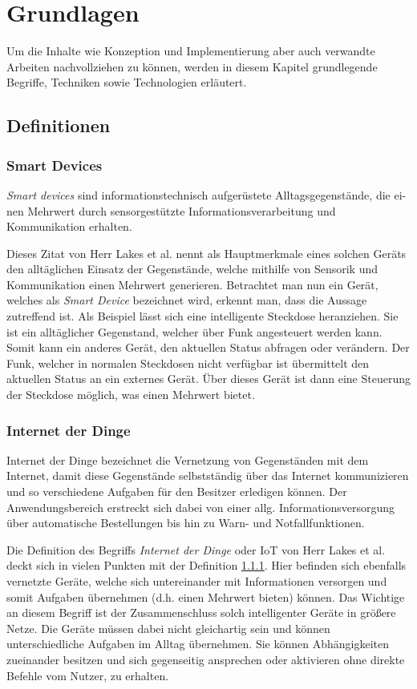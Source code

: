 \chapter{Grundlagen}
Um die Inhalte wie Konzeption und Implementierung aber auch verwandte Arbeiten nachvollziehen zu können, werden in diesem Kapitel grundlegende Begriffe, Techniken sowie Technologien erläutert.

\section{Definitionen} \label{Definitionen}
    \subsection{Smart Devices} \label{SmartDevices}
        \emph{Smart devices} sind \glqq informationstechnisch aufgerüstete Alltagsgegenstände, die ei-nen Mehrwert durch sensorgestützte Informationsverarbeitung und Kommunikation erhalten.\grqq{} \cite{lackes_siepermann_2018}
        
        Dieses Zitat von Herr Lakes et al. nennt als Hauptmerkmale eines solchen Geräts den alltäglichen Einsatz der Gegenstände, welche mithilfe von Sensorik und Kommunikation einen Mehrwert generieren.
        Betrachtet man nun ein Gerät, welches als \emph{Smart Device} bezeichnet wird, erkennt man, dass die Aussage zutreffend ist. Als Beispiel lässt sich eine intelligente Steckdose heranziehen. Sie ist ein alltäglicher Gegenstand, welcher über Funk angesteuert werden kann. Somit kann ein anderes Gerät, den aktuellen Status abfragen oder verändern.
        Der Funk, welcher in normalen Steckdosen nicht verfügbar ist übermittelt den aktuellen Status an ein externes Gerät. Über dieses Gerät ist dann eine Steuerung der Steckdose möglich, was einen Mehrwert bietet.
    
    \subsection{Internet der Dinge}
        Internet der Dinge \glqq bezeichnet die Vernetzung von Gegenständen mit dem Internet, damit diese Gegenstände selbstständig über das Internet kommunizieren und so verschiedene Aufgaben für den Besitzer erledigen können. Der Anwendungsbereich erstreckt sich dabei von einer allg. Informationsversorgung über automatische Bestellungen bis hin zu Warn- und Notfallfunktionen.\grqq{}
        \cite{lackes_siepermann_2018_iot}
    
        Die Definition des Begriffs \emph{Internet der Dinge} oder \ac{IoT} von Herr Lakes et al. deckt sich in vielen Punkten mit der Definition \ref{SmartDevices}. Hier befinden sich ebenfalls vernetzte Geräte, welche sich untereinander mit Informationen versorgen und somit Aufgaben übernehmen (d.h. einen Mehrwert bieten) können. Das Wichtige an diesem Begriff ist der Zusammenschluss solch intelligenter Geräte in größere Netze. Die Geräte müssen dabei nicht gleichartig sein und können unterschiedliche Aufgaben im Alltag übernehmen. Sie können Abhängigkeiten zueinander besitzen und sich gegenseitig ansprechen oder aktivieren ohne direkte Befehle vom Nutzer, zu erhalten.
        
